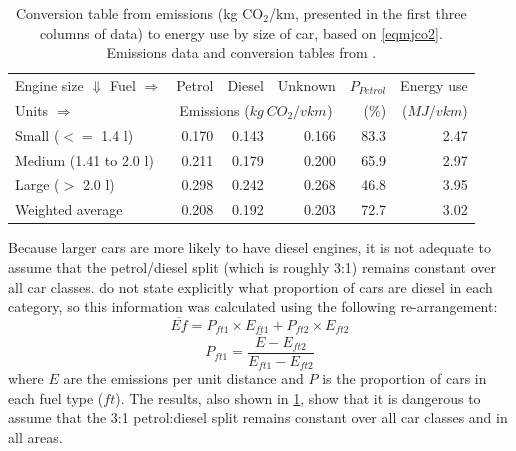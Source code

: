 \documentclass[a4paper, 11pt, twoside]{Thesis}
\begin{document}
\begin{table}[htbp]
\caption[Conversion table from emissions to energy use by size of car]
{Conversion table from emissions (kg CO$_2$/km,
presented in the first three columns of data) to energy use by size of car,
based on \cref{eqmjco2}.
Emissions data and conversion tables from \citet{Defra2011}.}
\begin{center}
\begin{tabular}{llrrrrr}
\toprule
\multicolumn{ 2}{l}{Engine size $\Downarrow$ Fuel $\Rightarrow$} & \multicolumn{1}{l}{Petrol} & \multicolumn{1}{l}{Diesel} & \multicolumn{1}{l}{Unknown} & \multicolumn{1}{l}{$P_{Petrol}$} & \multicolumn{1}{l}{Energy use} \\
Units $\Rightarrow$  & &\multicolumn{3}{c}{Emissions (${kg ~CO_{2}}/{vkm}_{}$)} & (\%) & ($MJ/vkm$) \\
\midrule
\multicolumn{ 2}{l}{Small ($<=$ 1.4 l)} & 0.170 & 0.143 & 0.166 & 83.3 & 2.47 \\
\multicolumn{ 2}{l}{Medium (1.41 to 2.0 l)} & 0.211 & 0.179 & 0.200 & 65.9 & 2.97 \\
\multicolumn{ 2}{l}{Large ($>$ 2.0 l)} & 0.298 & 0.242 & 0.268 & 46.8 & 3.95 \\
\multicolumn{ 2}{l}{Weighted average} & 0.208 & 0.192 & 0.203 & 72.7 & 3.02 \\
\bottomrule
\end{tabular}\end{center}
\label{tdefracar}
\end{table}

Because larger cars are more likely to have diesel engines, it is not adequate
to assume that the petrol/diesel split (which is roughly 3:1)
remains constant over all car classes. \citet{Defra2011} do not state
explicitly what proportion of cars are diesel in each category, so this
information was calculated using the following re-arrangement:
\begin{equation}
 \overline{Ef} = P_{ft1} \times E_{ft1} + P_{ft2} \times E_{ft2}
\end{equation}
\begin{equation}
  P_{ft1} = \frac{\overline{E} - E_{ft2}}{E_{ft1} - E_{ft2}}
\end{equation}
where $E$ are the emissions per unit distance and $P$ is the proportion of cars
in each fuel type ($ft$). The results, also shown in \cref{tdefracar}, show that
it is dangerous to assume that the 3:1 petrol:diesel split remains constant over
all car classes and in all areas.
\end{document}
